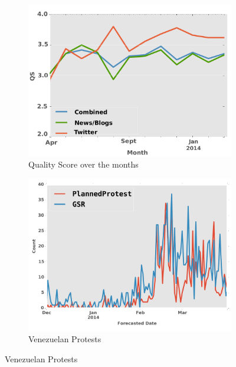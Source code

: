 \documentclass[letterpaper]{article}
\begin{document}
\begin{figure}
\begin{subfigure}{0.40\columnwidth}
    \centering
  \includegraphics[width=0.8\columnwidth]{monthlyqs}
  \caption{\scriptsize Quality Score over the months}
  \label{fig:monthlyqs}
\end{subfigure}\hspace{.5pt}
\begin{subfigure}{0.40\columnwidth}
    \centering
  \includegraphics[width=0.8\columnwidth]{venezuela_new}
  \caption{\scriptsize Venezuelan Protests}
  \label{fig:venezuela_feb}
\end{subfigure}


\end{figure}
\end{document}
